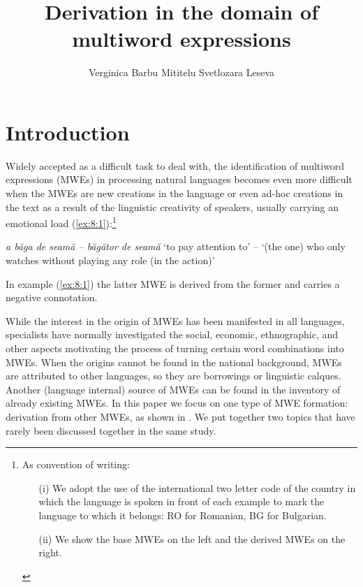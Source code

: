 \documentclass[output=paper]{langsci/langscibook}
\author{Verginica Barbu Mititelu\affiliation{Romanian Academy Research Institute for Artificial Intelligence}%
\lastand Svetlozara Leseva\affiliation{Institute for Bulgarian Language, Bulgarian Academy of Sciences}}
\title{Derivation in the domain of multiword expressions}
\begin{document}
\section{Introduction}
\label{introduction}


Widely accepted as a difficult task to deal with, the identification of
multiword expressions (MWEs) in processing natural languages becomes
even more difficult when the MWEs are new creations in the language or
even ad-hoc creations in the text as a result of the linguistic
creativity of speakers, usually carrying an emotional load  (\ref{ex:8:1}):\footnote{
As convention of writing: 
\begin{itemize}
\item[(i)]  We adopt
the use of the international two letter code of the country in which the language is spoken in front
of each example to mark the language to which it belongs: RO for
Romanian, BG for Bulgarian. 
\item[(ii)] We show the base
MWEs on the left and the derived MWEs on the right.
\end{itemize}
}

 


\begin{exe}
\ex \label{ex:8:1}
\settowidth{}
\textit{a băga de seamă – băgător de seamă}  
\glt ‘to pay attention to’ – ‘(the one) who only watches without playing any
role (in the action)’
\end{exe}


In example (\ref{ex:8:1}) the latter MWE is derived from the
former and carries a negative connotation.

While the interest in the origin of MWEs has been manifested in all
languages, specialists have normally investigated the social, economic,
ethnographic, and other aspects motivating the process of turning certain
word combinations into MWEs. When the origins cannot be found in
the national background, MWEs are attributed to other languages, so
they are borrowings or linguistic calques. Another (language internal)
source of MWEs can be found in the inventory of already existing
MWEs. In this paper we focus on one type of MWE formation: derivation
from other MWEs, as shown in . We put together two topics that have
rarely been discussed together in the same study.
\end{document}
